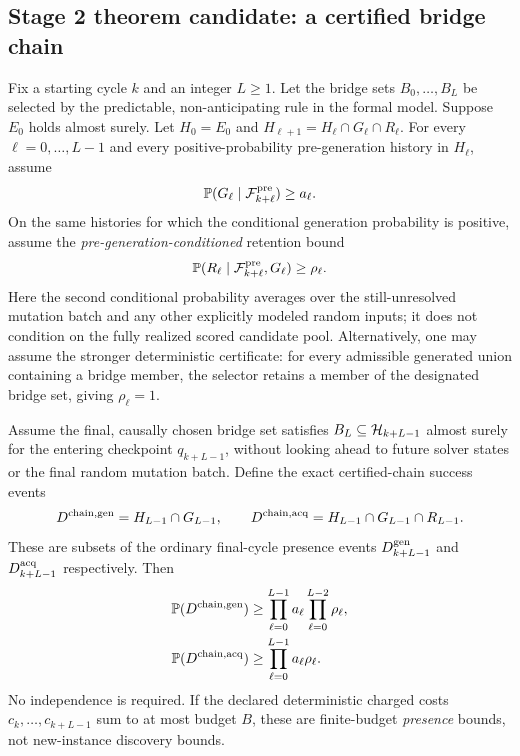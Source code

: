 \subsection{Stage 2 theorem candidate: a certified bridge chain}
 

\begin{proposition}
\label{prop:bridge-chain}
Fix a starting cycle $k$ and an integer $L\geq1$. Let the bridge sets
$B_0,\ldots,B_L$ be selected by the predictable, non-anticipating rule in
the formal model. Suppose $E_0$ holds almost surely. Let
$H_0=E_0$ and $H_{\ell+1}=H_\ell\cap G_\ell\cap R_\ell$.
For every $\ell=0,\ldots,L-1$ and every positive-probability
pre-generation history in $H_\ell$, assume
\[
 \mathbb{P}(G_\ell\mid\mathcal F_{k+\ell}^{\rm pre})\geq a_\ell.
\]
On the same histories for which the conditional generation probability is
positive, assume the \emph{pre-generation-conditioned} retention bound
\[
 \mathbb{P}(R_\ell\mid
       \mathcal F_{k+\ell}^{\rm pre},G_\ell)\geq\rho_\ell.
\]
Here the second conditional probability averages over the still-unresolved
mutation batch and any other explicitly modeled random inputs; it does not
condition on the fully realized scored candidate pool.
Alternatively, one may assume the stronger deterministic certificate:
for every admissible generated union containing a bridge member, the
selector retains a member of the designated bridge set, giving
$\rho_\ell=1$.

Assume the final, causally chosen bridge set satisfies
$B_L\subseteq\mathcal{H}_{k+L-1}$ almost surely for the entering checkpoint
$q_{k+L-1}$, without looking ahead to future solver states or the final
random mutation batch. Define the exact certified-chain success events
\[
 D^{\rm chain,gen}=H_{L-1}\cap G_{L-1},\qquad
 D^{\rm chain,acq}=H_{L-1}\cap G_{L-1}\cap R_{L-1}.
\]
These are subsets of the ordinary final-cycle presence events
$D_{k+L-1}^{\rm gen}$ and $D_{k+L-1}^{\rm acq}$ respectively. Then
\begin{align*}
 \mathbb{P}(D^{\rm chain,gen})
 &\geq \prod_{\ell=0}^{L-1}a_\ell
           \prod_{\ell=0}^{L-2}\rho_\ell,\\
 \mathbb{P}(D^{\rm chain,acq})
 &\geq \prod_{\ell=0}^{L-1}a_\ell\rho_\ell.
\end{align*}
No independence is required. If the declared deterministic charged costs
$c_k,\ldots,c_{k+L-1}$ sum to at most budget $B$, these are finite-budget
\emph{presence} bounds, not new-instance discovery bounds.


\end{proposition}
